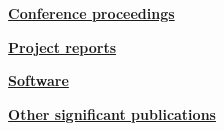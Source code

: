 \documentclass[A4,11pt]{article}
\makeatletter
\newcommand*{\newbibstartnumber}[1]{%
  \apptocmd{\thebibliography}{%
    \global\c@NAT@ctr #1\relax
    \addtocounter{NAT@ctr}{-1}%
  }{}{}%
}
\makeatother
\begin{document}
\vspace{2mm}
\noindent \textbf{\ \ \underline{Conference proceedings}}
\begin{bibunit}
\nocite{apsrev42Control}
\nocite{Huanfa2020gisruk,Huanfa2019gisruk,Huanfa2017gisruk,Huanfa2017geocomp,Yajie2013geocomp,Huanfa2013ICESEP,Hamed2013ICESEP}
\putbib[publications]
\end{bibunit}

\vspace{2mm}
\noindent \textbf{\ \ \underline{Project reports}}
\begin{bibunit}
\nocite{apsrev42Control}
\nocite{Cheng2016cpc}
\putbib[publications]
\end{bibunit}

\vspace{2mm}
\noindent \textbf{\ \ \underline{Software}}
\begin{bibunit}
\nocite{}
\putbib[publications]
\end{bibunit}

\vspace{2mm}
\noindent \textbf{\ \ \underline{Other significant publications}}
\newbibstartnumber{6}
\begin{bibunit}
\nocite{apsrev42Control}
\putbib[publications]
\end{bibunit}

\begin{comment}
\end{comment}
\end{document}
